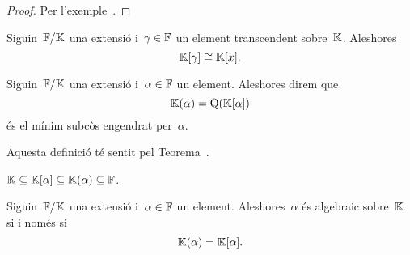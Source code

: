 \documentclass[../teoria-de-Galois.tex]{subfiles}
\begin{document}
    \begin{proof}
        Per l'exemple~.
    \end{proof}
    \begin{corollary}
        \label{cor:el-minim-subanell-engendrat-per-un-transcendent-es-isomorfa-a-lanell-de-polinomis}
        Siguin~\(\mathbb{F}/\mathbb{K}\) una extensió i~\(\gamma\in\mathbb{F}\) un element transcendent sobre~\(\mathbb{K}\).
        Aleshores
        \[
            \mathbb{K}[\gamma]\cong\mathbb{K}[x].
        \]
    \end{corollary}
    \begin{definition}
        \label{def:minim-subcos-engendrat-per-un-element-duna-extensio}
        Siguin~\(\mathbb{F}/\mathbb{K}\) una extensió i~\(\alpha\in\mathbb{F}\) un element.
        Aleshores direm que
        \[
            \mathbb{K}(\alpha)=\operatorname{Q}(\mathbb{K}[\alpha])
        \]
        és el mínim subcòs engendrat per~\(\alpha\).

        Aquesta definició té sentit pel Teorema~.
    \end{definition}
    \begin{observation}
        \label{obs:inclusio-del-minim-subanell-i-subcos-engendrats-per-un-element}
        \(\mathbb{K}\subseteq\mathbb{K}[\alpha]\subseteq\mathbb{K}(\alpha)\subseteq\mathbb{F}\).
    \end{observation}
    \begin{lemma}
        \label{lema:un-element-es-algebraic-si-i-nomes-si-el-minim-subanell-engendrat-per-lelement-es-un-cos}
        Siguin~\(\mathbb{F}/\mathbb{K}\) una extensió i~\(\alpha\in\mathbb{F}\) un element.
        Aleshores~\(\alpha\) és algebraic sobre~\(\mathbb{K}\) si i només si
        \[
            \mathbb{K}(\alpha)=\mathbb{K}[\alpha].
        \]
    \end{lemma}
\end{document}
